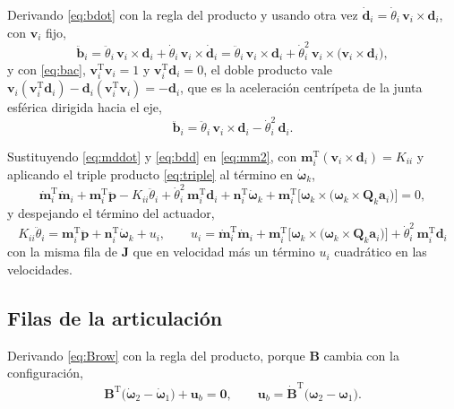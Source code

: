 \documentclass[11pt]{article}
\newcommand{\T}{^{\mathrm{T}}}
\newcommand{\pvec}{\mathbf{p}}
\newcommand{\wv}{\boldsymbol{\omega}}
\begin{document}
Derivando \eqref{eq:bdot} con la regla del producto y usando otra vez $\dot{\mathbf{d}}_i=\dot\theta_i\,\mathbf{v}_i\times\mathbf{d}_i$, con $\mathbf{v}_i$ fijo,
\begin{equation}
\ddot{\mathbf{b}}_i=\ddot\theta_i\,\mathbf{v}_i\times\mathbf{d}_i+\dot\theta_i\,\mathbf{v}_i\times\dot{\mathbf{d}}_i
=\ddot\theta_i\,\mathbf{v}_i\times\mathbf{d}_i+\dot\theta_i^2\,\mathbf{v}_i\times\big(\mathbf{v}_i\times\mathbf{d}_i\big),
\label{eq:bdd0}
\end{equation}
y con \eqref{eq:bac}, $\mathbf{v}_i\T\mathbf{v}_i=1$ y $\mathbf{v}_i\T\mathbf{d}_i=0$, el doble producto vale $\mathbf{v}_i(\mathbf{v}_i\T\mathbf{d}_i)-\mathbf{d}_i(\mathbf{v}_i\T\mathbf{v}_i)=-\mathbf{d}_i$, que es la aceleración centrípeta de la junta esférica dirigida hacia el eje,
\begin{equation}
\ddot{\mathbf{b}}_i=\ddot\theta_i\,\mathbf{v}_i\times\mathbf{d}_i-\dot\theta_i^2\,\mathbf{d}_i .
\label{eq:bdd}
\end{equation}

Sustituyendo \eqref{eq:mddot} y \eqref{eq:bdd} en \eqref{eq:mm2}, con $\mathbf{m}_i\T(\mathbf{v}_i\times\mathbf{d}_i)=K_{ii}$ y aplicando el triple producto \eqref{eq:triple} al término en $\dot{\wv}_k$,
\begin{equation}
\dot{\mathbf{m}}_i\T\dot{\mathbf{m}}_i+\mathbf{m}_i\T\ddot{\pvec}-K_{ii}\ddot\theta_i+\dot\theta_i^2\,\mathbf{m}_i\T\mathbf{d}_i+\mathbf{n}_i\T\dot{\wv}_k+\mathbf{m}_i\T\Big[\wv_k\times\big(\wv_k\times\mathbf{Q}_k\mathbf{a}_i\big)\Big]=0 ,
\label{eq:qdd0}
\end{equation}
y despejando el término del actuador,
\begin{equation}
\boxed{\ K_{ii}\ddot\theta_i=\mathbf{m}_i\T\ddot{\pvec}+\mathbf{n}_i\T\dot{\wv}_k+u_i ,
\qquad
u_i=\dot{\mathbf{m}}_i\T\dot{\mathbf{m}}_i+\mathbf{m}_i\T\Big[\wv_k\times\big(\wv_k\times\mathbf{Q}_k\mathbf{a}_i\big)\Big]+\dot\theta_i^2\,\mathbf{m}_i\T\mathbf{d}_i\ }
\label{eq:qdd}
\end{equation}
con la misma fila de $\mathbf{J}$ que en velocidad más un término $u_i$ cuadrático en las velocidades.

\subsection{Filas de la articulación}

Derivando \eqref{eq:Brow} con la regla del producto, porque $\mathbf{B}$ cambia con la configuración,
\begin{equation}
\mathbf{B}\T\big(\dot{\wv}_2-\dot{\wv}_1\big)+\mathbf{u}_b=\mathbf{0},
\qquad
\mathbf{u}_b=\dot{\mathbf{B}}\T\big(\wv_2-\wv_1\big).
\label{eq:ub}
\end{equation}
\end{document}
